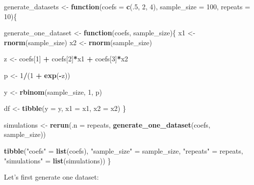 \documentclass[
]{article}
\newenvironment{Shaded}{\begin{snugshade}}{\end{snugshade}}
\newcommand{\ControlFlowTok}[1]{\textcolor[rgb]{0.13,0.29,0.53}{\textbf{#1}}}
\newcommand{\DataTypeTok}[1]{\textcolor[rgb]{0.13,0.29,0.53}{#1}}
\newcommand{\DecValTok}[1]{\textcolor[rgb]{0.00,0.00,0.81}{#1}}
\newcommand{\KeywordTok}[1]{\textcolor[rgb]{0.13,0.29,0.53}{\textbf{#1}}}
\newcommand{\NormalTok}[1]{#1}
\newcommand{\OperatorTok}[1]{\textcolor[rgb]{0.81,0.36,0.00}{\textbf{#1}}}
\newcommand{\StringTok}[1]{\textcolor[rgb]{0.31,0.60,0.02}{#1}}
\begin{document}
\begin{Shaded}
\begin{Highlighting}[]
\NormalTok{generate\_datasets \textless{}{-}}\StringTok{ }\ControlFlowTok{function}\NormalTok{(}\DataTypeTok{coefs =} \KeywordTok{c}\NormalTok{(.}\DecValTok{5}\NormalTok{, }\DecValTok{2}\NormalTok{, }\DecValTok{4}\NormalTok{), }\DataTypeTok{sample\_size =} \DecValTok{100}\NormalTok{, }\DataTypeTok{repeats =} \DecValTok{10}\NormalTok{)\{}

\NormalTok{  generate\_one\_dataset \textless{}{-}}\StringTok{ }\ControlFlowTok{function}\NormalTok{(coefs, sample\_size)\{}
\NormalTok{  x1 \textless{}{-}}\StringTok{ }\KeywordTok{rnorm}\NormalTok{(sample\_size)}
\NormalTok{  x2 \textless{}{-}}\StringTok{ }\KeywordTok{rnorm}\NormalTok{(sample\_size)}
  
\NormalTok{  z \textless{}{-}}\StringTok{ }\NormalTok{coefs[}\DecValTok{1}\NormalTok{] }\OperatorTok{+}\StringTok{ }\NormalTok{coefs[}\DecValTok{2}\NormalTok{]}\OperatorTok{*}\NormalTok{x1 }\OperatorTok{+}\StringTok{ }\NormalTok{coefs[}\DecValTok{3}\NormalTok{]}\OperatorTok{*}\NormalTok{x2}

\NormalTok{  p \textless{}{-}}\StringTok{ }\DecValTok{1}\OperatorTok{/}\NormalTok{(}\DecValTok{1} \OperatorTok{+}\StringTok{ }\KeywordTok{exp}\NormalTok{(}\OperatorTok{{-}}\NormalTok{z))}

\NormalTok{  y \textless{}{-}}\StringTok{ }\KeywordTok{rbinom}\NormalTok{(sample\_size, }\DecValTok{1}\NormalTok{, p)}

\NormalTok{  df \textless{}{-}}\StringTok{ }\KeywordTok{tibble}\NormalTok{(}\DataTypeTok{y =}\NormalTok{ y, }\DataTypeTok{x1 =}\NormalTok{ x1, }\DataTypeTok{x2 =}\NormalTok{ x2)}
\NormalTok{  \}}

\NormalTok{  simulations \textless{}{-}}\StringTok{ }\KeywordTok{rerun}\NormalTok{(}\DataTypeTok{.n =}\NormalTok{ repeats, }\KeywordTok{generate\_one\_dataset}\NormalTok{(coefs, sample\_size))}
 
  \KeywordTok{tibble}\NormalTok{(}\StringTok{"coefs"}\NormalTok{ =}\StringTok{ }\KeywordTok{list}\NormalTok{(coefs), }\StringTok{"sample\_size"}\NormalTok{ =}\StringTok{ }\NormalTok{sample\_size, }\StringTok{"repeats"}\NormalTok{ =}\StringTok{ }\NormalTok{repeats, }\StringTok{"simulations"}\NormalTok{ =}\StringTok{ }\KeywordTok{list}\NormalTok{(simulations))}
\NormalTok{\}}
\end{Highlighting}
\end{Shaded}

Let's first generate one dataset:
\end{document}
